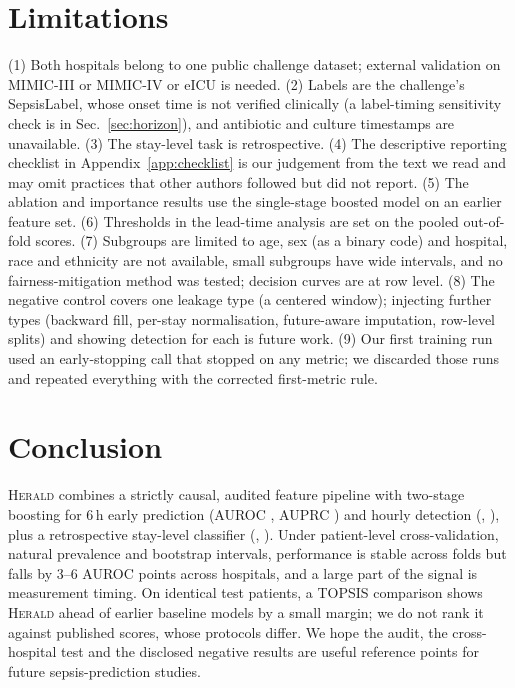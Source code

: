 \documentclass[preprint,12pt]{elsarticle}
\newcommand{\herald}{\textsc{Herald}}
\begin{document}
\section{Limitations}
\label{sec:limitations}
(1) Both hospitals belong to one public challenge dataset; external validation on MIMIC-III or MIMIC-IV \cite{johnson2016,johnson2023} or eICU \cite{pollard2018} is needed. (2) Labels are the challenge's SepsisLabel, whose onset time is not verified clinically (a label-timing sensitivity check is in Sec.~\ref{sec:horizon}), and antibiotic and culture timestamps are unavailable. (3) The stay-level task is retrospective. (4) The descriptive reporting checklist in Appendix~\ref{app:checklist} is our judgement from the text we read and may omit practices that other authors followed but did not report. (5) The ablation and importance results use the single-stage boosted model on an earlier feature set. (6) Thresholds in the lead-time analysis are set on the pooled out-of-fold scores. (7) Subgroups are limited to age, sex (as a binary code) and hospital, race and ethnicity are not available, small subgroups have wide intervals, and no fairness-mitigation method was tested; decision curves are at row level. (8) The negative control covers one leakage type (a centered window); injecting further types (backward fill, per-stay normalisation, future-aware imputation, row-level splits) and showing detection for each is future work. (9) Our first training run used an early-stopping call that stopped on any metric; we discarded those runs and repeated everything with the corrected first-metric rule.

\section{Conclusion}
\herald{} combines a strictly causal, audited feature pipeline with two-stage boosting for 6\,h early prediction (AUROC \AurocFc, AUPRC \AuprcFc) and hourly detection (\AurocDt, \AuprcDt), plus a retrospective stay-level classifier (\AurocStay, \AuprcStay). Under patient-level cross-validation, natural prevalence and bootstrap intervals, performance is stable across folds but falls by 3--6 AUROC points across hospitals, and a large part of the signal is measurement timing. On identical test patients, a TOPSIS comparison shows \herald{} ahead of earlier baseline models by a small margin; we do not rank it against published scores, whose protocols differ. We hope the audit, the cross-hospital test and the disclosed negative results are useful reference points for future sepsis-prediction studies.
\end{document}
